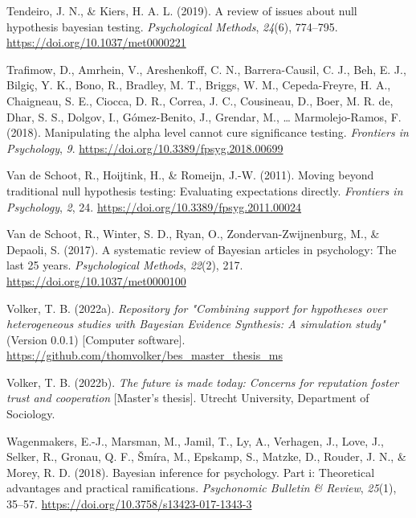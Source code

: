 \documentclass[
]{interact}
\newlength{\cslhangindent}
\newlength{\cslentryspacingunit} %
\newenvironment{CSLReferences}[2] %
 {%
  \setlength{\parindent}{0pt}
  \ifodd #1
  \let\oldpar\par
  \def\par{\hangindent=\cslhangindent\oldpar}
  \fi
  \setlength{\parskip}{#2\cslentryspacingunit}
 }%
 {}
\begin{document}
\begin{CSLReferences}{1}{0}
\leavevmode{}%
Tendeiro, J. N., \& Kiers, H. A. L. (2019). A review of issues about
null hypothesis bayesian testing. \emph{Psychological Methods},
\emph{24}(6), 774--795. \url{https://doi.org/10.1037/met0000221}

\leavevmode{}%
Trafimow, D., Amrhein, V., Areshenkoff, C. N., Barrera-Causil, C. J.,
Beh, E. J., Bilgiç, Y. K., Bono, R., Bradley, M. T., Briggs, W. M.,
Cepeda-Freyre, H. A., Chaigneau, S. E., Ciocca, D. R., Correa, J. C.,
Cousineau, D., Boer, M. R. de, Dhar, S. S., Dolgov, I., Gómez-Benito,
J., Grendar, M., \ldots{} Marmolejo-Ramos, F. (2018). Manipulating the
alpha level cannot cure significance testing. \emph{Frontiers in
Psychology}, \emph{9}. \url{https://doi.org/10.3389/fpsyg.2018.00699}

\leavevmode{}%
Van de Schoot, R., Hoijtink, H., \& Romeijn, J.-W. (2011). Moving beyond
traditional null hypothesis testing: Evaluating expectations directly.
\emph{Frontiers in Psychology}, \emph{2}, 24.
\url{https://doi.org/10.3389/fpsyg.2011.00024}

\leavevmode{}%
Van de Schoot, R., Winter, S. D., Ryan, O., Zondervan-Zwijnenburg, M.,
\& Depaoli, S. (2017). A systematic review of {B}ayesian articles in
psychology: The last 25 years. \emph{Psychological Methods},
\emph{22}(2), 217. \url{https://doi.org/10.1037/met0000100}

\leavevmode{}%
Volker, T. B. (2022a). \emph{{Repository for "Combining support for
hypotheses over heterogeneous studies with Bayesian Evidence Synthesis:
A simulation study"}} (Version 0.0.1) {[}Computer software{]}.
\url{https://github.com/thomvolker/bes_master_thesis_ms}

\leavevmode{}%
Volker, T. B. (2022b). \emph{The future is made today: Concerns for
reputation foster trust and cooperation} {[}Master's thesis{]}. Utrecht
University, Department of Sociology.

\leavevmode{}%
Wagenmakers, E.-J., Marsman, M., Jamil, T., Ly, A., Verhagen, J., Love,
J., Selker, R., Gronau, Q. F., Šmíra, M., Epskamp, S., Matzke, D.,
Rouder, J. N., \& Morey, R. D. (2018). Bayesian inference for
psychology. Part i: Theoretical advantages and practical ramifications.
\emph{Psychonomic Bulletin {\&} Review}, \emph{25}(1), 35--57.
\url{https://doi.org/10.3758/s13423-017-1343-3}


\end{CSLReferences}
\end{document}
